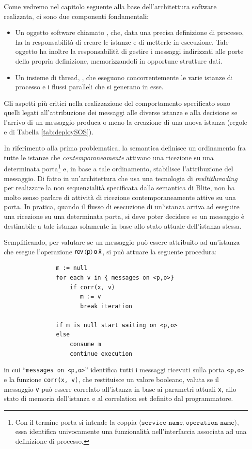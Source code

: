 Come vedremo nel capitolo seguente alla base dell'architettura software
realizzata, ci sono due componenti fondamentali:

\begin{itemize}
  \item Un oggetto software chiamato , che, data una   
  precisa definizione di processo, ha la responsabilità di creare le istanze
  e di metterle in esecuzione. Tale oggetto ha inoltre la responsabilità di
  gestire i messaggi indirizzati alle porte
  della propria definizione, memorizzandoli in opportune strutture dati.
  \item Un insieme di thread, , che eseguono concorrentemente
  le varie istanze di processo e i flussi paralleli che si generano in esse.
\end{itemize}

Gli aspetti più critici nella realizzazione del comportamento specificato
sono quelli legati all'attribuzione dei messaggi alle diverse
istanze e alla decisione se l'arrivo di un messaggio produca o meno la creazione
di una nuova istanza (regole  e  di Tabella
\ref{tab:deploySOS}).

In riferimento alla prima problematica, la semantica definisce un ordinamento
fra tutte le istanze che \emph{contemporaneamente} attivano una ricezione su una
determinata porta\footnote{Con il termine porta si intende la coppia $\langle
\texttt{service-name}, \texttt{operation-name} \rangle$, essa identifica
univocamente una funzionalità nell'interfaccia associata ad una
definizione di processo.} e, in base a tale ordinamento, stabilisce
l'attribuzione del messaggio. Di fatto in un'architettura che
usa una tecnologia di \emph{multithreading} per realizzare la non sequenzialità
specificata dalla semantica di Blite, non ha molto senso parlare di attività di
ricezione contemporaneamente attive su una porta. In pratica, quando il
flusso di esecuzione di un'istanza arriva ad eseguire una ricezione su una
determinata porta, si deve poter decidere se un messaggio è
destinabile a tale istanza solamente in base allo stato attuale dell'istanza
stessa.

Semplificando, per valutare se un messaggio può essere attribuito ad un'istanza
che esegue l'operazione ${\sf rcv}\,\langle {\sf p} \rangle\, {\sf o}\, \bar{{\sf x}}$, si può attuare la
seguente procedura:

\begin{verbatim}
               m := null
               for each v in { messages on <p,o>} 
                   if corr(x, v) 
                      m := v
                      break iteration
    
               if m is null start waiting on <p,o>
               else 
                   consume m
                   continue execution
\end{verbatim}
in cui ``\texttt{messages on <p,o>}'' identifica tutti i
messaggi ricevuti sulla porta \texttt{<p,o>} e la funzione \texttt{corr(x, v)},
che restituisce un valore booleano, valuta se il messaggio \texttt{v} può essere correlato all'istanza in
base ai parametri attuali \texttt{x}, allo stato di memoria dell'istanza e al
correlation set definito dal programmatore.

